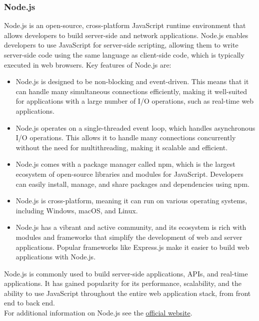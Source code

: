 \subsubsection{Node.js}\label{nodejs}
Node.js is an open-source, cross-platform JavaScript runtime environment that allows developers to build server-side and network applications. Node.js enables developers to use JavaScript for server-side scripting, allowing them to write server-side code using the same language as client-side code, which is typically executed in web browsers.
Key features of Node.js are:
\begin{itemize}
  \item Node.js is designed to be non-blocking and event-driven. This means that it can handle many simultaneous connections efficiently, making it well-suited for applications with a large number of I/O operations, such as real-time web applications.
  \item Node.js operates on a single-threaded event loop, which handles asynchronous I/O operations. This allows it to handle many connections concurrently without the need for multithreading, making it scalable and efficient.
  \item Node.js comes with a package manager called npm, which is the largest ecosystem of open-source libraries and modules for JavaScript. Developers can easily install, manage, and share packages and dependencies using npm.
  \item Node.js is cross-platform, meaning it can run on various operating systems, including Windows, macOS, and Linux.
  \item Node.js has a vibrant and active community, and its ecosystem is rich with modules and frameworks that simplify the development of web and server applications. Popular frameworks like Express.js make it easier to build web applications with Node.js.
\end{itemize}
Node.js is commonly used to build server-side applications, APIs, and real-time applications. It has gained popularity for its performance, scalability, and the ability to use JavaScript throughout the entire web application stack, from front end to back end.\vspace{5mm} \\
For additional information on Node.js see the \href{https://nodejs.org/en/about}{official website}.

